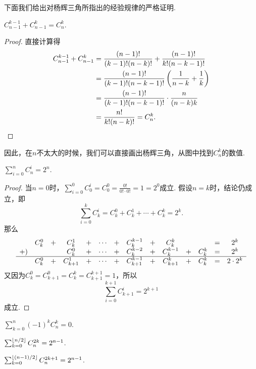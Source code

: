 下面我们给出对杨辉三角所指出的经验规律的严格证明.
\begin{property}\label{theorem:组合数性质2}
\(C_{n-1}^{k-1} + C_{n-1}^k = C_n^k\).
\begin{proof}
直接计算得
\begin{align*}
	C_{n-1}^{k-1} + C_{n-1}^k
	&= \frac{(n-1)!}{(k-1)! (n-k)!} + \frac{(n-1)!}{k! (n-k-1)!} \\
	&= \frac{(n-1)!}{(k-1)! (n-k-1)!} \left( \frac{1}{n-k} + \frac{1}{k} \right) \\
	&= \frac{(n-1)!}{(k-1)! (n-k-1)!} \cdot \frac{n}{(n-k)k} \\
	&= \frac{n!}{k! (n-k)!}
	= C_n^k. \qedhere
\end{align*}
\end{proof}
\end{property}
因此，在\(n\)不太大的时候，我们可以直接画出杨辉三角，从图中找到\(C_n^k\)的数值.

\begin{property}\label{theorem:组合数性质3}
\(\sum_{i=0}^n C_n^i = 2^n\).
\begin{proof}
当\(n=0\)时，\(\sum_{i=0}^0 C_0^i = C_0^0 = \frac{0!}{0! \cdot 0!} = 1 = 2^0\)成立.
假设\(n=k\)时，结论仍成立，即\[
\sum_{i=0}^k C_k^i
= C_k^0 + C_k^1 + \dotsb + C_k^k = 2^k.
\]那么\[
\begin{array}{*{14}{c}}
& C_k^0 &+& C_k^1 &+& \dotsb &+& C_k^{k-1} &+& C_k^k && &=& 2^k \\
+) & && C_k^0 &+& \dotsb &+& C_k^{k-2} &+& C_k^{k-1} &+& C_k^k &=& 2^k \\ \hline
& C_k^0 &+& C_{k+1}^1 &+& \dotsb &+& C_{k+1}^{k-1} &+& C_{k+1}^k &+& C_k^k &=& 2 \cdot 2^k
\end{array}
\]又因为\(C_k^0 = C_{k+1}^0 = C_k^k = C_{k+1}^{k+1} = 1\)，所以\[
\sum_{i=0}^{k+1} C_{k+1}^i = 2^{k+1}
\]成立.
\end{proof}
\end{property}

\begin{property}\label{theorem:组合数性质4}
\(\sum_{k=0}^n (-1)^k C_n^k = 0\).
\end{property}

\begin{property}\label{theorem:组合数性质5}
\(\sum_{k=0}^{\lfloor n/2\rfloor} C_n^{2k} = 2^{n-1}\).
\end{property}
\begin{property}\label{theorem:组合数性质6}
\(\sum_{k=0}^{\lfloor(n-1)/2\rfloor} C_n^{2k+1} = 2^{n-1}\).
\end{property}

